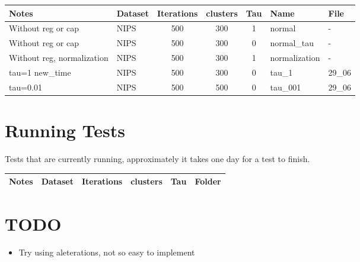 \documentclass[11pt,a4paper]{article}
\begin{document}
\begin{table}[h!]
	\begin{tabular}{|l|l|c|c|c|l|l|} 
      		\rowcolor[gray]{0.7}
		\hline
    Notes & Dataset & Iterations & clusters & Tau & Name & File \\ \hline
    Without reg or cap & NIPS & 500 & 300 & 1 & normal & - \\ \hline
    Without reg or cap & NIPS & 500 & 300 & 0 & normal\_tau & - \\ \hline
    Without reg, normalization & NIPS & 500 & 300 & 1 & normalization & - \\ \hline
    tau=1 new\_time & NIPS & 500 & 300 & 0 & tau\_1 & 29\_06\\ \hline
    tau=0.01 & NIPS & 500 & 500 & 0 & tau\_001 & 29\_06 \\ \hline

	\end{tabular}
\end{table}
\section{Running Tests}
Tests that are currently running, approximately it takes one day for a test to finish.
\begin{table}[h!]
	\begin{tabular}{|l|l|c|c|c|l|} 
      		\rowcolor[gray]{0.7}

		\hline
		Notes & Dataset & Iterations & clusters & Tau & Folder \\ \hline

	\end{tabular}
\end{table}

\section{TODO}

\begin{itemize}
	\item Try using aleterations, not so easy to implement
\end{itemize}
\end{document}
